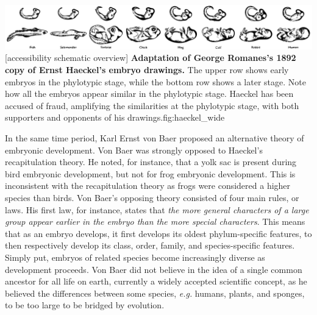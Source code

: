 {\includegraphics[width=2.2\textwidth]
{ch.introduction/imgs/haeckel_wide.png}}
[accessibility schematic overview]
{\textbf{Adaptation of George Romanes's 1892 copy of Ernst Haeckel's embryo drawings.} The upper row shows early embryos in the phylotypic stage, while the bottom row shows a later stage. Note how all the embryos appear similar in the phylotypic stage. Haeckel has been accused of fraud, amplifying the similarities at the phylotypic stage, with both supporters\cite{Richards2008} and opponents of his drawings\cite{Pennisi1997}.}{fig:haeckel_wide}

In the same time period, Karl Ernst von Baer proposed an alternative theory of embryonic development. Von Baer was strongly opposed to Haeckel's recapitulation theory. He noted, for instance, that a yolk sac is present during bird embryonic development, but not for frog embryonic development. This is inconsistent with the recapitulation theory as frogs were considered a higher species than birds. Von Baer's opposing theory consisted of four main rules, or laws\cite{baer1828}. His first law, for instance, states that \textit{the more general characters of a large group appear earlier in the embryo than the more special characters}. This means that as an embryo develops, it first develops its oldest phylum-specific features, to then respectively develop its class, order, family, and species-specific features. Simply put, embryos of related species become increasingly diverse as development proceeds. Von Baer did not believe in the idea of a single common ancestor for all life on earth, currently a widely accepted scientific concept, as he believed the differences between some species, \textit{e.g.} humans, plants, and sponges, to be too large to be bridged by evolution.

